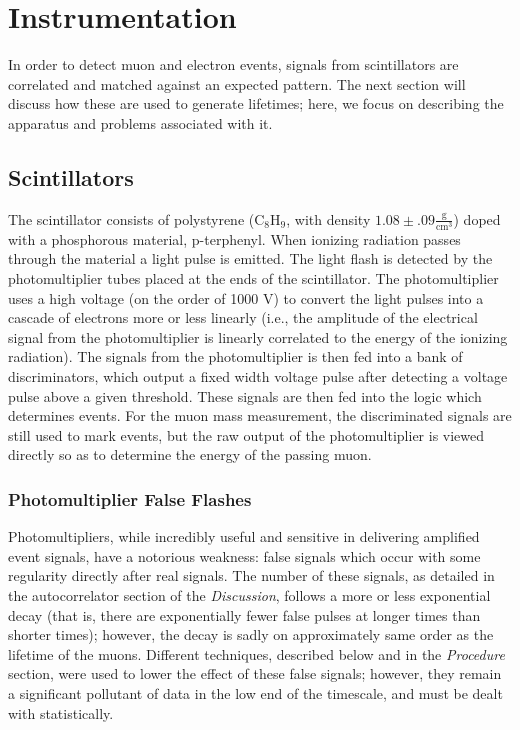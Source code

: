 \section{Instrumentation}

In order to detect muon and electron events, signals from scintillators are correlated and matched against an expected pattern. The next section will discuss how these are used to generate lifetimes; here, we focus on describing the apparatus and problems associated with it.

\subsection{Scintillators}

The scintillator consists of polystyrene ($\mathrm{C}_{8}\mathrm{H}_{9}$, with density $1.08 \pm .09 \frac{\mathrm{g}}{\mathrm{cm}^{3}}$) doped with a phosphorous material, p-terphenyl. When ionizing radiation passes through the material a light pulse is emitted. The light flash is detected by the photomultiplier tubes placed at the ends of the scintillator. The photomultiplier uses a high voltage (on the order of 1000 V) to convert the light pulses into a cascade of electrons more or less linearly (i.e., the amplitude of the electrical signal from the photomultiplier is linearly correlated to the energy of the ionizing radiation). The signals from the photomultiplier is then fed into a bank of discriminators, which output a fixed width voltage pulse after detecting a voltage pulse above a given threshold. These signals are then fed into the logic which determines events. For the muon mass measurement, the discriminated signals are still used to mark events, but the raw output of the photomultiplier is viewed directly so as to determine the energy of the passing muon.

\subsubsection{Photomultiplier False Flashes}

Photomultipliers, while incredibly useful and sensitive in delivering amplified event signals, have a notorious weakness: false signals which occur with some regularity directly after real signals. The number of these signals, as detailed in the autocorrelator section of the \emph{Discussion}, follows a more or less exponential decay (that is, there are exponentially fewer false pulses at longer times than shorter times); however, the decay is sadly on approximately same order as the lifetime of the muons. Different techniques, described below and in the \emph{Procedure} section, were used to lower the effect of these false signals; however, they remain a significant pollutant of data in the low end of the timescale, and must be dealt with statistically.


